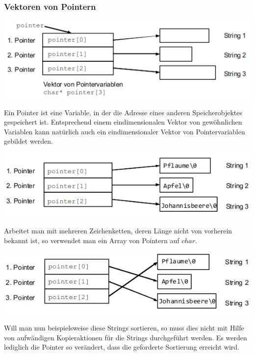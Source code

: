 		\subsubsection{Vektoren von Pointern }		
			\begin{minipage}[c]{9 cm}
				\includegraphics[width=1\textwidth]{pics/pointer_vektoren_1.jpg}
			\end{minipage}
			\hspace*{0.5cm}
			\begin{minipage}[c]{9 cm}
				Ein Pointer ist eine Variable, in der die Adresse eines anderen Speicherobjektes gespeichert ist. Entsprechend einem eindimensionalen Vektor von gewöhnlichen Variablen kann natürlich auch ein eindimensionaler Vektor von Pointervariablen gebildet werden.
			\end{minipage}
			
			\begin{minipage}[c]{9 cm}
				\includegraphics[width=1\textwidth]{pics/pointer_vektoren_2.jpg}
			\end{minipage}
			\hspace*{0.5cm}
			\begin{minipage}[c]{9 cm}
				Arbeitet man mit mehreren Zeichenketten, deren Länge nicht von vorherein bekannt ist, so verwendet man ein Array von Pointern auf $char$.
			\end{minipage}
			
			\begin{minipage}[c]{9 cm}
				\includegraphics[width=1\textwidth]{pics/pointer_vektoren_3.jpg}
			\end{minipage}
			\hspace*{0.5cm}
			\begin{minipage}[c]{9 cm}
				Will man nun beispielsweise diese Strings sortieren, so muss dies nicht mit Hilfe von aufwändigen Kopieraktionen für die Strings durchgeführt werden. Es werden lediglich die Pointer so verändert, dass die geforderte Sortierung erreicht wird.
			\end{minipage}
			
